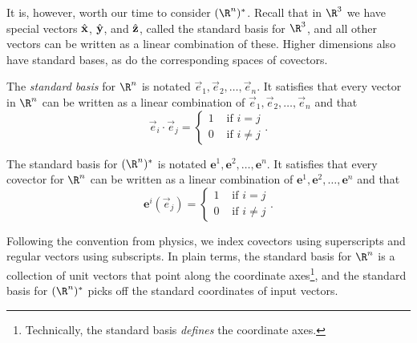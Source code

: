 It is, however, worth our time to consider $(\R^n)^*$.  Recall that
in $\R^3$ we have special vectors ${\hat {\mathbf x}}$, ${\hat {\mathbf y}}$, and ${\hat {\mathbf z}}$,
called the standard basis for $\R^3$,
and all other vectors can be written as a linear combination of these.
Higher dimensions also have standard bases, as do the corresponding
spaces of covectors.

\begin{definition}
	The \emph{standard basis} for $\R^n$ is notated 
	$\vec e_1,\vec e_2,\ldots,\vec e_n$. It satisfies that 
	every vector in $\R^n$ can be written as a linear combination of
	$\vec e_1,\vec e_2,\ldots,\vec e_n$ and that
	\[
		\vec e_i\cdot \vec e_j = \begin{cases}
			1 &\text{ if } i=j\\
			0 &\text{ if } i\neq j
		\end{cases}.
	\]

	The standard basis for $(\R^n)^*$ is notated
	$\bm e^1,\bm e^2,\ldots,\bm e^n$. It satisfies that
	every covector for $\R^n$ can be written as a linear combination of
	$\bm e^1,\bm e^2,\ldots,\bm e^n$ and that
	\[
		\bm e^i(\vec e_j) = \begin{cases}
			1 &\text{ if } i=j\\
			0 &\text{ if } i\neq j
		\end{cases}.
	\]
\end{definition}

Following the convention from physics, we index covectors using superscripts
and regular vectors using subscripts.  In plain terms, the standard basis for
$\R^n$ is a collection of unit vectors that point along the coordinate axes\footnote{
Technically, the standard basis \emph{defines} the coordinate axes.}, and the
standard basis for $(\R^n)^*$ picks off the standard coordinates of input
vectors.

